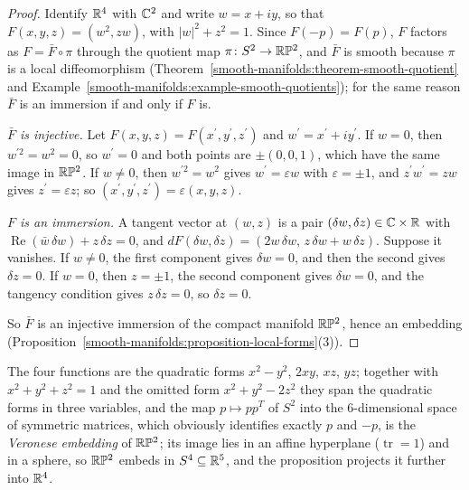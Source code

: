 \begin{proof}
Identify $\mathbb{R}^4$ with $\mathbb{C}^2$ and write $w = x + iy$, so that $F(x, y, z) = (w^2, zw)$, with $|w|^2 + z^2 = 1$. Since $F(-p) = F(p)$, $F$ factors as $F = \bar F \circ \pi$ through the quotient map $\pi \colon S^2 \to \mathbb{R}\mathbb{P}^2$,
and $\bar F$ is smooth because $\pi$ is a local diffeomorphism (Theorem~\ref{smooth-manifolds:theorem-smooth-quotient} and Example~\ref{smooth-manifolds:example-smooth-quotients}); for the same reason
$\bar F$ is an immersion if and only if $F$ is.

\emph{$\bar F$ is injective.} Let $F(x, y, z) = F(x^{\prime}, y^{\prime}, z^{\prime})$ and $w^{\prime} = x^{\prime} + iy^{\prime}$. If $w = 0$, then $w^{\prime2} = w^2 = 0$, so $w^{\prime} = 0$ and both points are $\pm(0, 0, 1)$, which have the same
image in $\mathbb{R}\mathbb{P}^2$. If $w \neq 0$, then $w^{\prime2} = w^2$ gives $w^{\prime} = \varepsilon w$ with $\varepsilon = \pm1$, and $z^{\prime}w^{\prime} = zw$ gives $z^{\prime} = \varepsilon z$; so $(x^{\prime}, y^{\prime}, z^{\prime}) = \varepsilon(x, y, z)$.

\emph{$F$ is an immersion.} A tangent vector at $(w, z)$ is a pair $(\delta w, \delta z) \in \mathbb{C} \times \mathbb{R}$ with $\operatorname{Re}(\bar w\,\delta w) + z\,\delta z = 0$, and $dF(\delta w, \delta z) = (2w\,\delta w, \, z\,\delta w + w\,\delta z)$. Suppose
it vanishes. If $w \neq 0$, the first component gives $\delta w = 0$, and then the second gives $\delta z = 0$. If $w = 0$, then $z = \pm1$, the second component gives $\delta w = 0$, and the tangency condition gives
$z\,\delta z = 0$, so $\delta z = 0$.

So $\bar F$ is an injective immersion of the compact manifold $\mathbb{R}\mathbb{P}^2$, hence an embedding (Proposition~\ref{smooth-manifolds:proposition-local-forms}(3)).
\end{proof}

The four functions are the quadratic forms $x^2 - y^2$, $2xy$, $xz$, $yz$; together with $x^2 + y^2 + z^2 = 1$ and the omitted form $x^2 + y^2 - 2z^2$ they span the quadratic forms in three variables, and the map
$p \mapsto pp^T$ of $S^2$ into the $6$-dimensional space of symmetric matrices, which obviously identifies exactly $p$ and $-p$, is the \emph{Veronese embedding} of $\mathbb{R}\mathbb{P}^2$; its image lies in an affine hyperplane
($\operatorname{tr} = 1$) and in a sphere, so $\mathbb{R}\mathbb{P}^2$ embeds in $S^4 \subseteq \mathbb{R}^5$, and the proposition projects it further into $\mathbb{R}^4$.

